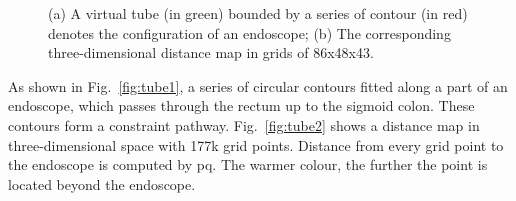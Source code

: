 \setcounter{subfigure}{0}
\begin{figure}[t!]
\centering
{}
\caption[(a) A virtual tube bounded by a series of contour denotes the configuration of an endoscope;
(b) The corresponding three-dimensional distance map in grids of 86x48x43.]{(a) A virtual tube (in green) bounded by a series of contour (in red) denotes the configuration of an endoscope;
(b) The corresponding three-dimensional distance map in grids of 86x48x43.}
\label{fig:tube}
\end{figure}

As shown in Fig.~\ref{fig:tube1}, a series of circular contours fitted along a part of an endoscope, which passes through the rectum up to the sigmoid colon. 
These contours form a constraint pathway. 
Fig.~\ref{fig:tube2} shows a distance map in three-dimensional space with 177k grid points. 
Distance from every grid point to the endoscope is computed by \gls{pq}. 
The warmer colour, the further the point is located beyond the endoscope.

